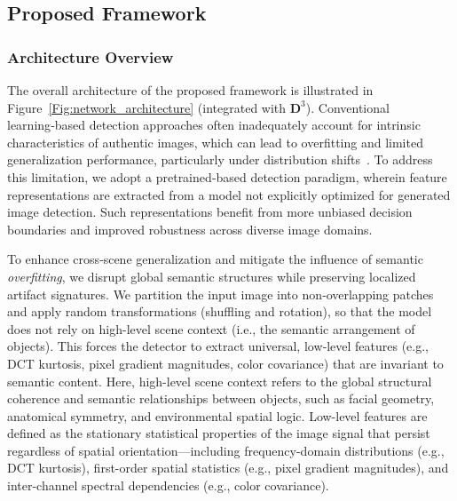 \documentclass[letterpaper,twocolumn,10pt]{article}
\newcommand{\bm}[1]{\mathbf{#1}} %
\begin{document}
\subsection{Proposed Framework}

\subsubsection{Architecture Overview}
The overall architecture of the proposed framework is illustrated in Figure~\ref{Fig:network_architecture} (integrated with $\bm{D}^3$). Conventional learning‑based detection approaches often inadequately account for intrinsic characteristics of authentic images, which can lead to overfitting and limited generalization performance, particularly under distribution shifts~\cite{yang2025d3}. To address this limitation, we adopt a pretrained‑based detection paradigm, wherein feature representations are extracted from a model not explicitly optimized for generated image detection. Such representations benefit from more unbiased decision boundaries and improved robustness across diverse image domains. 

To enhance cross‑scene generalization and mitigate the influence of semantic \emph{overfitting}, we disrupt global semantic structures while preserving localized artifact signatures. We partition the input image into non‑overlapping patches and apply random transformations (shuffling and rotation), so that the model does not rely on high-level scene context (i.e., the semantic arrangement of objects). This forces the detector to extract universal, low‑level features (e.g., DCT kurtosis, pixel gradient magnitudes, color covariance) that are invariant to semantic content.  
Here, high-level scene context refers to the global structural coherence and semantic relationships between objects, such as facial geometry, anatomical symmetry, and environmental spatial logic.
Low-level features are defined as the stationary statistical properties of the image signal that persist regardless of spatial orientation---including frequency-domain distributions (e.g., DCT kurtosis), first-order spatial statistics (e.g., pixel gradient magnitudes), and inter-channel spectral dependencies (e.g., color covariance).
\end{document}
